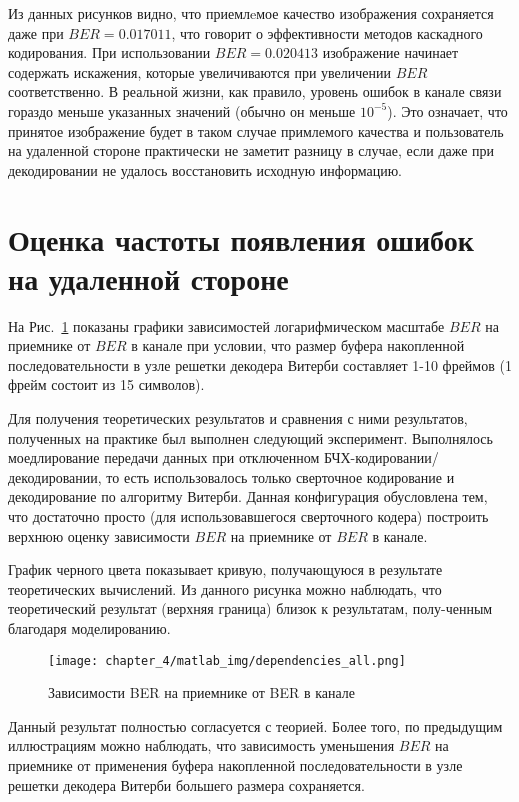 Из данных рисунков видно, что приемлeмое качество изображения сохраняется даже при $BER=0.017011$, что говорит
о эффективности методов каскадного кодирования. При использовании $BER=0.020413$ изображение начинает содержать
искажения, которые увеличиваются при увеличении $BER$ соответственно. В реальной жизни, как правило, уровень ошибок в канале связи
гораздо меньше указанных значений (обычно он меньше $10^{-5}$). Это означает, что принятое изображение будет в таком случае примлемого
качества и пользователь на удаленной стороне практически не заметит разницу в случае, если даже при декодировании не удалось
восстановить исходную информацию.

\section{Оценка частоты появления ошибок на удаленной стороне}
На Рис.~\ref{dependencies_all} показаны графики зависимостей логарифмическом масштабе $BER$ на приемнике от $BER$ в канале при условии,
что размер буфера накопленной последовательности в узле решетки декодера Витерби составляет 1-10 фреймов (1 фрейм состоит из 15 символов).

Для получения теоретических результатов и сравнения с ними результатов, полученных на практике был выполнен следующий
эксперимент. Выполнялось моедлирование передачи данных при отключенном БЧХ-кодировании/декодировании, то есть использовалось
только сверточное кодирование и декодирование по алгоритму Витерби. Данная конфигурация обусловлена тем, что достаточно
просто (для использовавшегося сверточного кодера) построить верхнюю оценку зависимости $BER$ на приемнике от $BER$ в канале.

График черного цвета показывает кривую,
получающуюся в результате теоретических вычислений. Из данного рисунка можно наблюдать, что теоретический результат
(верхняя граница) близок к результатам, полу-ченным благодаря моделированию.
\begin{figure}[h]
\begin{center}
\texttt{[image: chapter\_4/matlab\_img/dependencies\_all.png]}
\caption{Зависимости BER на приемнике от BER в канале}
\label{dependencies_all}
\end{center}
\end{figure}

Данный результат полностью согласуется с теорией. Более того, по предыдущим иллюстрациям можно наблюдать, что
зависимость уменьшения $BER$ на приемнике от применения буфера накопленной последовательности в узле решетки
декодера Витерби большего размера сохраняется.